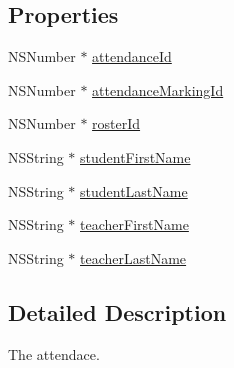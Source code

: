 \subsection*{Properties}
\begin{DoxyCompactItemize}
\item 
N\+S\+Number $\ast$ \hyperlink{interface_attendance_a47331d4a3bf6a66898af099cf7e8ceb3}{attendance\+Id}
\item 
N\+S\+Number $\ast$ \hyperlink{interface_attendance_a2a250e9bc55299c5f2c4936f1346a396}{attendance\+Marking\+Id}
\item 
N\+S\+Number $\ast$ \hyperlink{interface_attendance_abd800fad3cefbc7a28865fdbf9841ce5}{roster\+Id}
\item 
N\+S\+String $\ast$ \hyperlink{interface_attendance_ac19139347042d483a23013202a923ff8}{student\+First\+Name}
\item 
N\+S\+String $\ast$ \hyperlink{interface_attendance_a0750a37e87bdcd6e188846b174faf211}{student\+Last\+Name}
\item 
N\+S\+String $\ast$ \hyperlink{interface_attendance_aa8205f78bffac5fd2dd3ce2a44ef1e96}{teacher\+First\+Name}
\item 
N\+S\+String $\ast$ \hyperlink{interface_attendance_ad532e084c8758266e0106649e4f5605e}{teacher\+Last\+Name}
\end{DoxyCompactItemize}


\subsection{Detailed Description}
The attendace. 


